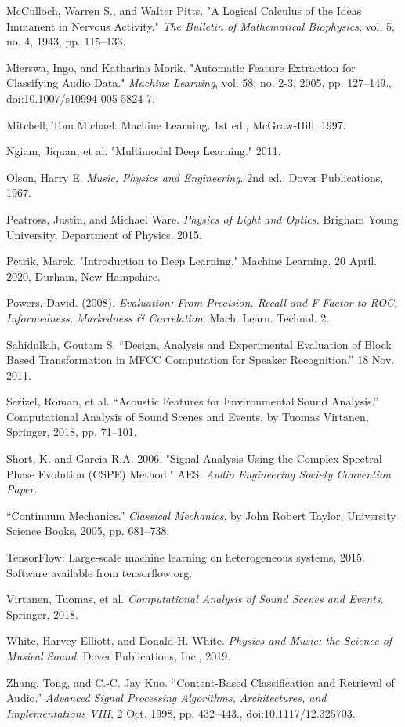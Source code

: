 \documentclass[12pt,letterpaper]{article}
\begin{document}
\begin{thebibliography}{9}
McCulloch, Warren S., and Walter Pitts. "A Logical Calculus of the Ideas Immanent in Nervous Activity." \textit{The Bulletin of Mathematical Biophysics}, vol. 5, no. 4, 1943, pp. 115–133.

Mierswa, Ingo, and Katharina Morik. "Automatic Feature Extraction for Classifying Audio Data." \textit{Machine Learning}, vol. 58, no. 2-3, 2005, pp. 127–149., doi:10.1007/s10994-005-5824-7.

Mitchell, Tom Michael. Machine Learning. 1st ed., McGraw-Hill, 1997.

Ngiam, Jiquan, et al. "Multimodal Deep Learning." 2011. 

Olson, Harry E. \textit{Music, Physics and Engineering}. 2nd ed., Dover Publications, 1967.

Peatross, Justin, and Michael Ware. \textit{Physics of Light and Optics.} Brigham Young University, Department of Physics, 2015.

Petrik, Marek. "Introduction to Deep Learning." Machine Learning. 20 April. 2020, Durham, New Hampshire.

Powers, David. (2008). \textit{Evaluation: From Precision, Recall and F-Factor to ROC, Informedness, Markedness \& Correlation}. Mach. Learn. Technol. 2. 

Sahidullah, Goutam S. “Design, Analysis and Experimental Evaluation of Block Based Transformation in MFCC Computation for Speaker Recognition.” 18 Nov. 2011. 

Serizel, Roman, et al. “Acoustic Features for Environmental Sound Analysis.” Computational Analysis of Sound Scenes and Events, by Tuomas Virtanen, Springer, 2018, pp. 71–101. 

Short, K. and Garcia R.A. 2006. "Signal Analysis Using the Complex Spectral Phase Evolution (CSPE) Method." AES: \textit{Audio Engineering Society Convention Paper}.

“Continuum Mechanics.” \textit{Classical Mechanics}, by John Robert Taylor, University Science Books, 2005, pp. 681–738. 

TensorFlow: Large-scale machine learning on heterogeneous systems,
2015. Software available from tensorflow.org.

Virtanen, Tuomas, et al. \textit{Computational Analysis of Sound Scenes and Events.} Springer, 2018.

White, Harvey Elliott, and Donald H. White. \textit{Physics and Music: the Science of Musical Sound}. Dover Publications, Inc., 2019.

Zhang, Tong, and C.-C. Jay Kuo. “Content-Based Classification and Retrieval of Audio.” \textit{Advanced Signal Processing Algorithms, Architectures, and Implementations VIII}, 2 Oct. 1998, pp. 432–443., doi:10.1117/12.325703.

\end{thebibliography}

\end{document}
